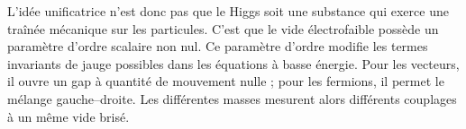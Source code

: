 L’idée unificatrice n’est donc pas que le Higgs soit une substance qui exerce une traînée mécanique sur les particules. C’est que le vide électrofaible possède un paramètre d’ordre scalaire non nul. Ce paramètre d’ordre modifie les termes invariants de jauge possibles dans les équations à basse énergie. Pour les vecteurs, il ouvre un gap à quantité de mouvement nulle ; pour les fermions, il permet le mélange gauche--droite. Les différentes masses mesurent alors différents couplages à un même vide brisé.
